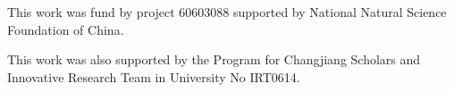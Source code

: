 \documentclass[journal]{IEEEtran}
\begin{document}
This work was fund by project 60603088 supported by National Natural Science Foundation of China.

This work was also supported by the Program for Changjiang
Scholars and Innovative Research Team in University No
IRT0614.




\ifCLASSOPTIONcaptionsoff
  \newpage
\fi




\end{document}
